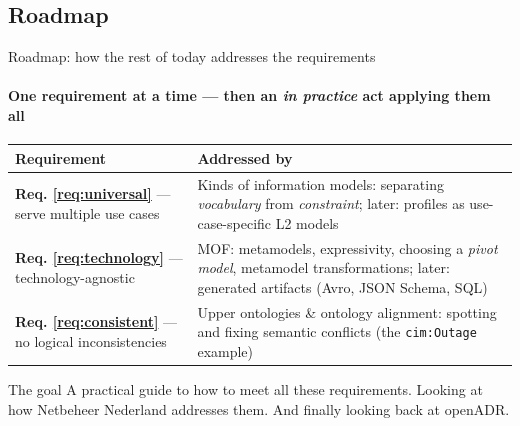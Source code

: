 \subsection{Roadmap}
\begin{frame}{Roadmap: how the rest of today addresses the requirements}
  \framesubtitle{One requirement at a time — then an \textit{in practice} act applying them all}

  \setlength{\tabcolsep}{5pt}
  \renewcommand{\arraystretch}{1.3}
  \begin{center}
    \footnotesize
    \begin{tabular}{@{}p{4.8cm}p{7.0cm}@{}}
      \toprule
      \textbf{Requirement} & \textbf{Addressed by}\\
      \midrule
      \textbf{Req. \ref{req:universal}} --- serve multiple use cases &
        Kinds of information models: separating \emph{vocabulary} from \emph{constraint};
        later: profiles as use-case-specific L2 models\\
      \textbf{Req. \ref{req:technology}} --- technology-agnostic &
        MOF: metamodels, expressivity, choosing a \emph{pivot model},
        metamodel transformations; later: generated artifacts (Avro, JSON Schema, SQL)\\
      \textbf{Req. \ref{req:consistent}} --- no logical inconsistencies &
        Upper ontologies \& ontology alignment: spotting and fixing semantic conflicts (the
        \texttt{cim:Outage} example)\\
      \bottomrule
    \end{tabular}
  \end{center}

  \vspace{0.1cm}
  \begin{block}{The goal}
    A practical guide to how to meet all these requirements. Looking at how Netbeheer Nederland addresses them. And finally looking back at openADR.
  \end{block}
\end{frame}
